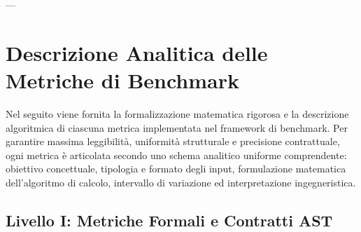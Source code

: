 ---

\section{Descrizione Analitica delle Metriche di Benchmark}
\label{sec:metriche_analitiche}

Nel seguito viene fornita la formalizzazione matematica rigorosa e la descrizione algoritmica di ciascuna metrica implementata nel framework di benchmark. Per garantire massima leggibilità, uniformità strutturale e precisione contrattuale, ogni metrica è articolata secondo uno schema analitico uniforme comprendente: obiettivo concettuale, tipologia e formato degli input, formulazione matematica dell'algoritmo di calcolo, intervallo di variazione ed interpretazione ingegneristica.

\subsection{Livello I: Metriche Formali e Contratti AST}


